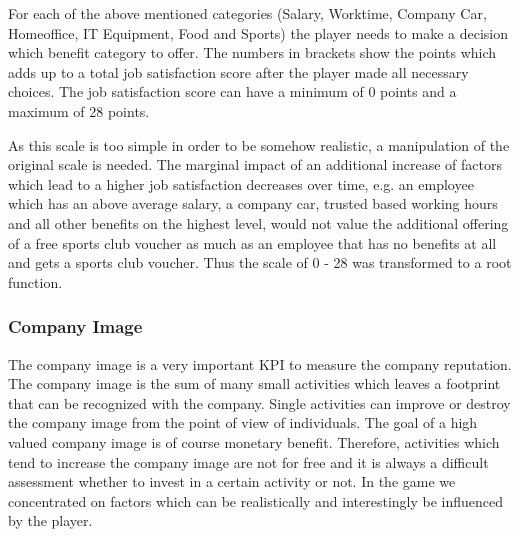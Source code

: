 For each of the above mentioned categories (Salary, Worktime, Company Car, Homeoffice, IT Equipment, Food and Sports) the player needs to make a decision which benefit category to offer. The numbers in brackets show the points which adds up to a total job satisfaction score after the player made all necessary choices. The job satisfaction score can have a minimum of 0 points and a maximum of 28 points.

As this scale is too simple in order to be somehow realistic, a manipulation of the original scale is needed. The marginal impact of an additional increase of factors which lead to a higher job satisfaction decreases over time, e.g. an employee which has an above average salary, a company car, trusted based working hours and all other benefits on the highest level, would not value the additional offering of a free sports club voucher as much as an employee that has no benefits at all and gets a sports club voucher. Thus the scale of 0 - 28 was transformed to a root function.


\subsubsection{Company Image}
The company image is a very important KPI to measure the company reputation. The company image is the sum of many small activities which leaves a footprint that can be recognized with the company. Single activities can improve or destroy the company image from the point of view of individuals. The goal of a high valued company image is of course monetary benefit. Therefore, activities which tend to increase the company image are not for free and it is always a difficult assessment whether to invest in a certain activity or not. In the game we concentrated on factors which can be realistically and interestingly be influenced by the player.

